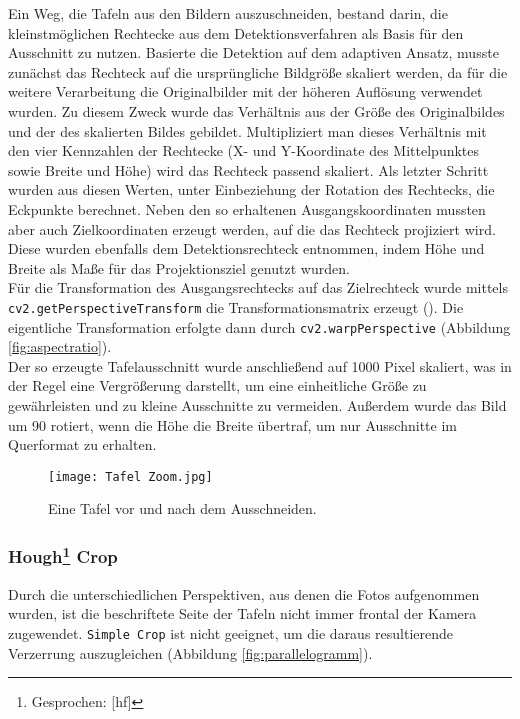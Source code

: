 Ein Weg, die Tafeln aus den Bildern auszuschneiden, bestand darin, die kleinstmöglichen Rechtecke aus dem Detektionsverfahren als Basis für den Ausschnitt zu nutzen. Basierte die Detektion auf dem adaptiven Ansatz, musste zunächst das Rechteck auf die ursprüngliche Bildgröße skaliert werden, da für die weitere Verarbeitung die Originalbilder mit der höheren Auflösung verwendet wurden. Zu diesem Zweck wurde das Verhältnis aus der Größe des Originalbildes und der des skalierten Bildes gebildet. Multipliziert man dieses Verhältnis mit den vier Kennzahlen der Rechtecke (X- und Y-Koordinate des Mittelpunktes sowie Breite und Höhe) wird das Rechteck passend skaliert. Als letzter Schritt wurden aus diesen Werten, unter Einbeziehung der Rotation des Rechtecks, die Eckpunkte berechnet.  Neben den so erhaltenen Ausgangskoordinaten mussten aber auch Zielkoordinaten erzeugt werden, auf die das Rechteck projiziert wird. Diese wurden ebenfalls dem Detektionsrechteck entnommen, indem Höhe und Breite als Maße für das Projektionsziel genutzt wurden.\\
Für die Transformation des Ausgangsrechtecks auf das Zielrechteck wurde mittels \verb|cv2.getPerspectiveTransform| die Transformationsmatrix erzeugt (\cite{cvtransform}). Die eigentliche Transformation erfolgte dann durch \verb|cv2.warpPerspective| (Abbildung  \ref{fig:aspectratio}).\\
Der so erzeugte Tafelausschnitt wurde anschließend auf 1000 Pixel skaliert, was in der Regel eine Vergrößerung darstellt, um eine einheitliche Größe zu gewährleisten und zu kleine Ausschnitte zu vermeiden. Außerdem wurde das Bild um 90 \degree rotiert, wenn die Höhe die Breite übertraf, um nur Ausschnitte im Querformat zu erhalten.

\begin{figure}[h!]
\centering
\texttt{[image: Tafel Zoom.jpg]}
\caption{Eine Tafel vor und nach dem Ausschneiden.}
\label{fig:tafelcrop}
\end{figure}

\subsubsection{Hough\protect\footnote{Gesprochen: [h\textturnv{}f]} Crop}

Durch die unterschiedlichen Perspektiven, aus denen die Fotos aufgenommen wurden, ist die beschriftete Seite der Tafeln nicht immer frontal der Kamera zugewendet. \verb|Simple Crop| ist nicht geeignet, um die daraus resultierende Verzerrung auszugleichen (Abbildung  \ref{fig:parallelogramm}). 

